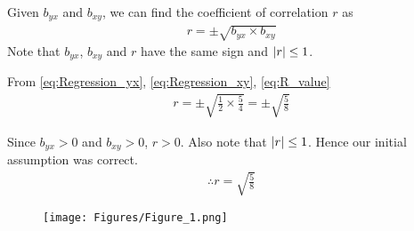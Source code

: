 \documentclass[journal,12pt,twocolumn]{IEEEtran}
\begin{document}
Given $b_{yx}$ and $b_{xy}$, we can find the coefficient of correlation $r$ as
\begin{align}
  r = \pm\sqrt{b_{yx} \times b_{xy}}
  \label{eq:R_value}
\end{align}
Note that $b_{yx}$, $b_{xy}$ and $r$ have the same sign and $\left\vert r\right\vert \le 1$.

From
\eqref{eq:Regression_yx},
\eqref{eq:Regression_xy},
\eqref{eq:R_value}
\begin{align}
  r = \pm \sqrt{\frac{1}{2} \times \frac{5}{4}} = \pm \sqrt{\frac{5}{8}}
\end{align}

Since $b_{yx} > 0$ and $b_{xy} > 0$, $r > 0$. Also note that $\left\vert r\right\vert \le 1$. Hence our initial assumption was correct.
\begin{align}
  \therefore r = \sqrt{\frac{5}{8}}
\end{align}

\begin{figure}[!ht]
  \centering
  \texttt{[image: Figures/Figure\_1.png]}
  \label{Figure_1}
\end{figure}
\end{document}
